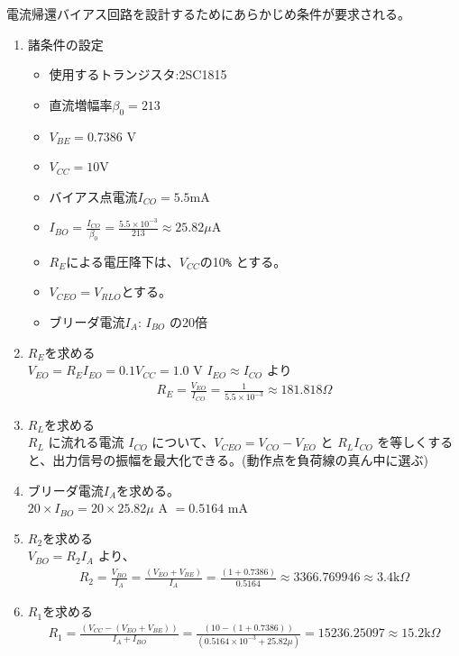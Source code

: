 電流帰還バイアス回路を設計するためにあらかじめ条件が要求される。
\begin{enumerate}
  \setlength{\parskip}{0cm} %
  \setlength{\itemsep}{0cm} %
  \item 諸条件の設定
  \begin{itemize}
    \item 使用するトランジスタ:2SC1815
    \item 直流増幅率$\beta_0 = 213$
    \item $V_{BE} = 0.7386$ V
    \item $V_{CC} = 10$V
    \item バイアス点電流$I_{CO}=5.5$mA
    \item $I_{BO}= \frac{I_{CO}}{\beta_0} = \frac{5.5\times10^{-3}}{213} \approx 25.82 \mu$A
    \item $R_E$による電圧降下は、$V_{CC}$の10\verb|%| とする。
    \item $V_{CEO} = V_{RLO}$とする。
    \item ブリーダ電流$I_A$: $I_{BO}$ の20倍
  \end{itemize}
  \item $R_E$を求める\\
  $V_{EO} = R_EI_{EO} = 0.1V_{CC} = 1.0$ V $I_{EO} \approx I_{CO}$ より
  \begin{align}
    R_E = \frac{V_{EO}}{I_{CO}} = \frac{1}{5.5 \times 10^{-3}} \approx 181.818 \Omega    
  \end{align}

  \item $R_L$を求める\\
  $R_L$ に流れる電流 $I_{CO}$ について、$V_{CEO} = V_{CO} -V_{EO}$ と $R_LI_{CO}$ を等しくすると、出力信号の振幅を最大化できる。(動作点を負荷線の真ん中に選ぶ)
  \item ブリーダ電流$I_A$を求める。\\
  $20 \times I_{BO} = 20 \times 25.82 \mu$ A $= 0.5164$ mA
  \item $R_2$を求める\\
  $V_{BO} = R_2I_A$ より、
  \begin{align}
    R_2 = \frac{V_{BO}}{I_A} = \frac{(V_{EO}+V_{BE})}{I_A} = \frac{(1+0.7386)}{0.5164}\approx 3366.769946 \approx 3.4 \textrm{k}\Omega    
  \end{align}
  \item $R_1$を求める
  \begin{align}
    R_1 = \frac{(V_{CC} - (V_{EO}+V_{BE}))}{I_A+I_{BO}} = \frac{(10 - (1+0.7386))}{(0.5164 \times 10^{-3} + 25.82\mu)} = 15236.25097 \approx 15.2 \textrm{k}\Omega
  \end{align}
\end{enumerate}
